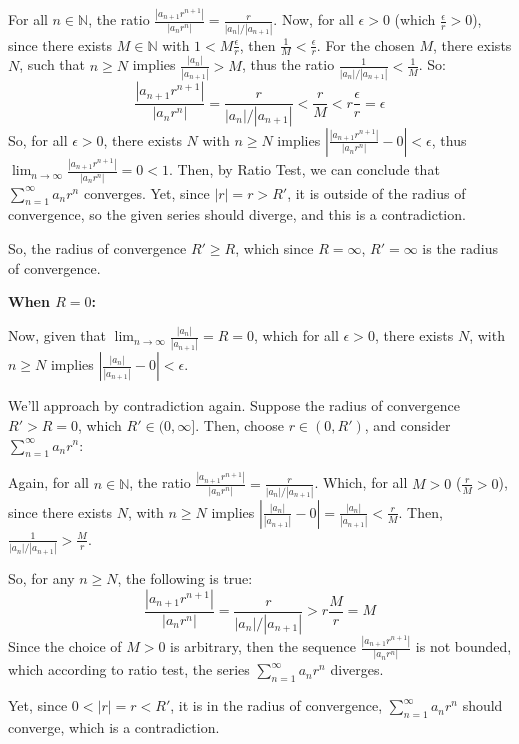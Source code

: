 \documentclass{article}
\begin{document}
For all $n\in\mathbb{N}$, the ratio $\frac{|a_{n+1}r^{n+1}|}{|a_nr^n|}=\frac{r}{|a_n|/|a_{n+1}|}$. Now, for all $\epsilon>0$ (which $\frac{\epsilon}{r}>0$), since there exists $M\in\mathbb{N}$ with $1<M\frac{\epsilon}{r}$,
then $\frac{1}{M}<\frac{\epsilon}{r}$. For the chosen $M$, there exists $N$, such that $n\geq N$ implies $\frac{|a_n|}{|a_{n+1}|}>M$, thus the ratio $\frac{1}{|a_n|/|a_{n+1}|}<\frac{1}{M}$. So:
$$\frac{|a_{n+1}r^{n+1}|}{|a_nr^n|}=\frac{r}{|a_n|/|a_{n+1}|}<\frac{r}{M} < r\frac{\epsilon}{r}=\epsilon$$
So, for all $\epsilon>0$, there exists $N$ with $n\geq N$ implies $\left|\frac{|a_{n+1}r^{n+1}|}{|a_nr^n|}-0\right|<\epsilon$, thus $\lim_{n\rightarrow\infty}\frac{|a_{n+1}r^{n+1}|}{|a_nr^n|}=0<1$.
Then, by Ratio Test, we can conclude that $\sum_{n=1}^{\infty}a_nr^n$ converges.  Yet, since $|r|=r>R'$, it is outside of the radius of convergence,
so the given series should diverge, and this is a contradiction.

So, the radius of convergence $R'\geq R$, which since $R=\infty$, $R'=\infty$ is the radius of convergence.

\hfill

\hfill

\textbf{When $R=0$:}

Now, given that $\lim_{n\rightarrow\infty}\frac{|a_{n}|}{|a_{n+1}|}=R=0$, which for all $\epsilon>0$, there exists $N$, with $n\geq N$ implies $\left|\frac{|a_n|}{|a_{n+1}|}-0\right|<\epsilon$.

\hfill

We'll approach by contradiction again. Suppose the radius of convergence $R'>R=0$, which $R'\in(0,\infty]$.
Then, choose $r\in (0,R')$, and consider $\sum_{n=1}^{\infty}a_nr^n$:

Again, for all $n\in\mathbb{N}$, the ratio $\frac{|a_{n+1}r^{n+1}|}{|a_nr^n|}=\frac{r}{|a_n|/|a_{n+1}|}$. Which, for all $M>0$ ($\frac{r}{M}>0$), since there exists $N$,
with $n\geq N$ implies $\left|\frac{|a_n|}{|a_{n+1}|}-0\right|=\frac{|a_n|}{|a_{n+1}|}<\frac{r}{M}$. Then, $\frac{1}{|a_n|/|a_{n+1}|}>\frac{M}{r}$.

So, for any $n\geq N$, the following is true:
$$\frac{|a_{n+1}r^{n+1}|}{|a_nr^n|}=\frac{r}{|a_n|/|a_{n+1}|} > r\frac{M}{r}=M$$
Since the choice of $M>0$ is arbitrary, then the sequence $\frac{|a_{n+1}r^{n+1}|}{|a_nr^n|}$ is not bounded, which according to ratio test, the series $\sum_{n=1}^{\infty}a_nr^n$ diverges.


Yet, since $0<|r|=r<R'$, it is in the radius of convergence, $\sum_{n=1}^{\infty}a_nr^n$ should converge, which is a contradiction.
\end{document}
